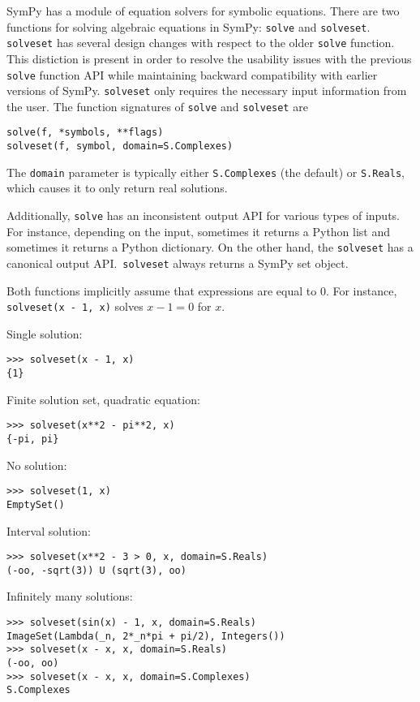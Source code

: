 SymPy has a module of equation solvers for symbolic equations. There are two
functions for solving algebraic equations in SymPy: \texttt{solve}
and \texttt{solveset}.
\texttt{solveset} has several design changes with respect to the older
\texttt{solve} function. This distiction is present in order to resolve the
usability issues with the
previous \texttt{solve} function API while maintaining backward compatibility
with earlier versions of SymPy.
\texttt{solveset} only requires the necessary input information from the user.
The function signatures of \texttt{solve} and \texttt{solveset} are
\begin{verbatim}
solve(f, *symbols, **flags)
solveset(f, symbol, domain=S.Complexes)
\end{verbatim}
The \texttt{domain} parameter is typically either \texttt{S.Complexes} (the
default) or \texttt{S.Reals}, which causes it to only return real solutions.

Additionally, \texttt{solve} has an inconsistent output API for various types
of inputs. For instance, depending on the input, sometimes it returns a Python
list and sometimes it returns a Python dictionary. On the other hand, the
\texttt{solveset} has a canonical output API.\ \texttt{solveset} always returns
a SymPy set object.

Both functions implicitly assume that expressions are equal to 0. For
instance, \texttt{solveset(x - 1, x)} solves $x - 1 = 0$ for $x$.

\noindent Single solution:
\begin{verbatim}
>>> solveset(x - 1, x)
{1}
\end{verbatim}

\noindent Finite solution set, quadratic equation:
\begin{verbatim}
>>> solveset(x**2 - pi**2, x)
{-pi, pi}
\end{verbatim}

\noindent No solution:
\begin{verbatim}
>>> solveset(1, x)
EmptySet()
\end{verbatim}

\noindent Interval solution:
\begin{verbatim}
>>> solveset(x**2 - 3 > 0, x, domain=S.Reals)
(-oo, -sqrt(3)) U (sqrt(3), oo)
\end{verbatim}

\noindent Infinitely many solutions:
\begin{verbatim}
>>> solveset(sin(x) - 1, x, domain=S.Reals)
ImageSet(Lambda(_n, 2*_n*pi + pi/2), Integers())
>>> solveset(x - x, x, domain=S.Reals)
(-oo, oo)
>>> solveset(x - x, x, domain=S.Complexes)
S.Complexes
\end{verbatim}

